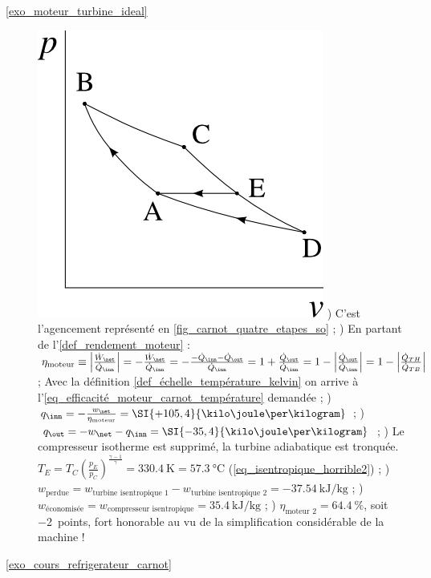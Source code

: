 \begin{description}
		\item [\ref{exo_moteur_turbine_ideal}]
					\includegraphics[width=\solutiondiagramwidth]{images/exo_sol_pv_carnot_turbine.png}
					) C’est l’agencement représenté en \cref{fig_carnot_quatre_etapes_so} ;
					) En partant de l’\cref{def_rendement_moteur}  : $\eta_\text{moteur} 
						\equiv \left| \frac{\dot W_\net}{\dot Q_\inn} \right|
						= - \frac{\dot W_\net}{\dot Q_\inn}
						= - \frac{-\dot Q_\inn - \dot Q_\out}{\dot Q_\inn}
						= 1 + \frac{\dot Q_\out}{\dot Q_\inn}
						= 1 - \left|\frac{\dot Q_\out}{\dot Q_\inn}\right| 
						= 1 - \left|\frac{\dot Q_{TH}}{\dot Q_{TB}}\right|$ ; Avec la définition \ref{def_échelle_température_kelvin} on arrive à l’\cref{eq_efficacité_moteur_carnot_température} demandée ;
					) ${q}_\inn = -\frac{w_\net}{\eta_\text{moteur}} = \SI{+105,4}{\kilo\joule\per\kilogram}$ ;
					) ${q}_\out = -w_\net - q_\inn = \SI{-35,4}{\kilo\joule\per\kilogram}$ ;
					) Le compresseur isotherme est supprimé, la turbine adiabatique est tronquée. $T_E = T_C \left(\frac{p_E}{p_C}\right)^\frac{\gamma - 1}{\gamma} = \SI{330,4}{\kelvin} = \SI{57,3}{\degreeCelsius}$ (\ref{eq_isentropique_horrible2}) ;
					) $w_\text{perdue} = w_\text{turbine isentropique 1} - w_\text{turbine isentropique 2} = \SI{-37,54}{\kilo\joule\per\kilogram}$ ;
					) $w_\text{économisée} = w_\text{compresseur isentropique} = \SI{+35,4}{\kilo\joule\per\kilogram}$ ;
					) $\eta_\text{moteur 2} = \SI{64,4}{\percent}$, soit \SI{-2}{points}, fort honorable au vu de la simplification considérable de la machine !
		\item [\ref{exo_cours_refrigerateur_carnot}]

\end{description}
